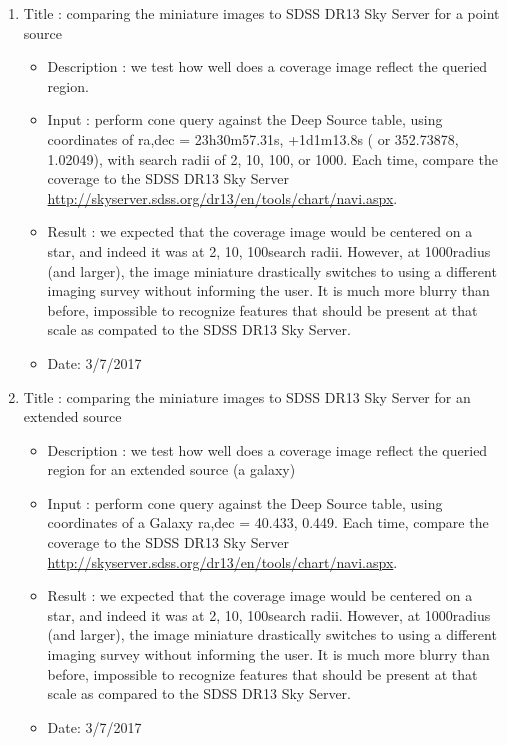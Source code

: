 \documentclass[DM,lsstdraft,toc]{lsstdoc}
\begin{document}
\begin{enumerate}
    \item Title : comparing the miniature images to SDSS DR13 Sky Server for a point source
    \begin{itemize}
      \item Description : we test how  well does a coverage image reflect the queried region.
      \item Input : perform cone query against the Deep Source table, using coordinates of ra,dec = 23h30m57.31s, +1d1m13.8s  ( or 352.73878\degree ,  1.02049\degree ), with search radii of 2\arcsec, 10\arcsec, 100\arcsec, or 1000\arcsec. Each time, compare the coverage to the SDSS DR13 Sky Server \url{http://skyserver.sdss.org/dr13/en/tools/chart/navi.aspx}.
      \item Result : we expected that the coverage image would be centered on a star, and indeed it was at 2\arcsec, 10\arcsec, 100\arcsec search radii. However, at 1000\arcsec radius (and larger), the image miniature drastically switches to using a different imaging survey without informing the user. It is much more blurry than before, impossible to recognize features that should be present at that scale as compated to the SDSS DR13 Sky Server.
      \item Date: 3/7/2017
    \end{itemize}

     \item Title : comparing the miniature images to SDSS DR13 Sky Server for an extended source
    \begin{itemize}
      \item Description : we test how  well does a coverage image reflect the queried region for an extended source (a galaxy)
      \item Input : perform cone query against the Deep Source table, using coordinates of a Galaxy  ra,dec =  40.433\degree, 0.449\degree \arcsec. Each time, compare the coverage to the SDSS DR13 Sky Server \url{http://skyserver.sdss.org/dr13/en/tools/chart/navi.aspx}.
      \item Result : we expected that the coverage image would be centered on a star, and indeed it was at 2\arcsec, 10\arcsec, 100\arcsec search radii. However, at 1000\arcsec radius (and larger), the image miniature drastically switches to using a different imaging survey without informing the user. It is much more blurry than before, impossible to recognize features that should be present at that scale as compared to the SDSS DR13 Sky Server.
      \item Date: 3/7/2017
    \end{itemize}
\end{enumerate}
\end{document}
